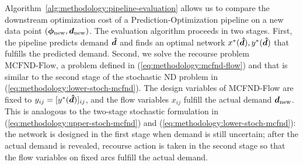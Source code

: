 Algorithm~\ref{alg:methodology:pipeline-evaluation} allows us to compare the downstream optimization cost of a Prediction-Optimization pipeline on a new data point $({\bm{\phi}}_{\text{new}}, {\bm{d}}_{\text{new}})$.
The evaluation algorithm proceeds in two stages. 
First, the pipeline predicts demand ${\bm{\hat{d}}}$ and finds an optimal network $x^*({\bm{\hat{d}}}), y^*({\bm{\hat{d}}})$ that fulfills the predicted demand. 
Second, we solve the recourse problem $\text{MCFND-Flow}$, a problem defined in (\ref{eq:methodology:mcfnd-flow}) and that is similar to the second stage of the stochastic ND problem in (\ref{eq:methodology:lower-stoch-mcfnd}). The design variables of MCFND-Flow are fixed to $y_{ij} = [y^*({\bm{\hat{d}}})]_{ij}$, and the flow variables $x_{ij}$ fulfill the actual demand ${\bm{d}}_{\text{new}}$. 
This is analogous to the two-stage stochastic formulation in (\ref{eq:methodology:upper-stoch-mcfnd}) and (\ref{eq:methodology:lower-stoch-mcfnd}): the network is designed in the first stage when demand is still uncertain; after the actual demand is revealed, recourse action is taken in the second stage so that the flow variables on fixed arcs fulfill the actual demand.

